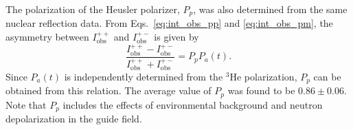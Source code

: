 \documentclass[%
 reprint,
superscriptaddress,
 amsmath,amssymb,
 aps,
floatfix,
]{revtex4-2}
\newcommand{\He}{$^3$He }
\begin{document}


The polarization of the Heusler polarizer, $P_p$, was also determined from the same nuclear reflection data.
From Eqs.~\ref{eq:int_obs_pp} and \ref{eq:int_obs_pm}, the asymmetry between $I^{++}_\mathrm{obs}$ and $I^{+-}_\mathrm{obs}$ is given by
\begin{equation}
    \frac{I^{++}_\mathrm{obs}-I^{+-}_\mathrm{obs}}{I^{++}_\mathrm{obs}+I^{+-}_\mathrm{obs}} = P_pP_a(t).
\end{equation}
Since $P_a(t)$ is independently determined from the \He polarization, $P_p$ can be obtained from this relation.
The average value of $P_p$ was found to be $0.86 \pm 0.06$.
Note that $P_p$ includes the effects of environmental background and neutron depolarization in the guide field.
\end{document}
